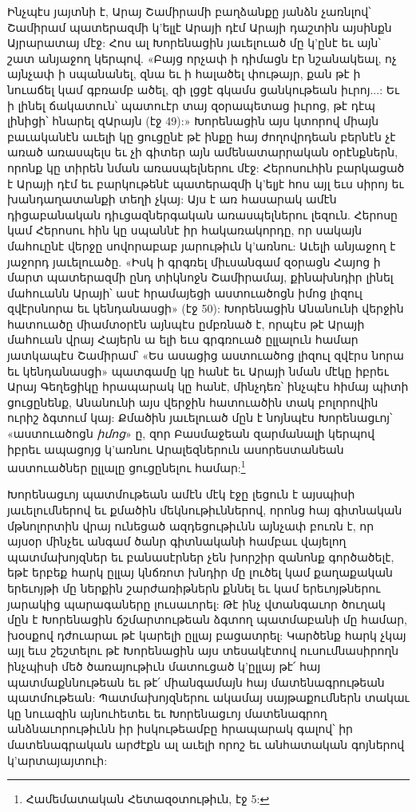 \documentclass{article}
\begin{document}
{Ինչպէս յայտնի է, Արայ Շամիրամի բաղձանքը յանձն չառնլով՝ Շամիրամ պատերազմի կ'ելլէ Արայի դէմ Արայի դաշտին այսինքն Այրարատայ մէջ: Հոս ալ Խորենացին յաւելուած մը կ'ընէ եւ այն՝ շատ անյաջող կերպով. «Բայց որչափ ի դիմացն էր նշանակեալ, ոչ այնչափ ի սպանանել, զնա եւ ի հալածել փութայր, քան թէ ի նուաճել կամ գբռամբ ածել, զի լցցէ գկամս ցանկութեան իւրոյ...: Եւ ի լինել ճակատուն՝ պատուէր տայ զօրապետաց իւրոց, թէ դէպ լինիցի՝ հնարել զԱրայն (էջ 49):» Խորենացին այս կտորով միայն բաւականէն աւելի կը ցուցընէ թէ ինքը հայ ժողովրդեան բերնէն չէ առած առասպելս եւ չի գիտեր այն ամենատարրական օրէնքներն, որոնք կը տիրեն նման առասպելներու մէջ: Հերոսուհին բարկացած է Արայի դէմ եւ բարկութենէ պատերազմի կ'ելյէ հոս այլ եւս սիրոյ եւ խանդաղատանքի տեղի չկայ: Այս է առ հասարակ ամէն դիցաբանական դիւցազներգական առասպելներու լեզուն. Հերոսը կամ Հերոսու հին կը սպաննէ իր հակառակորդը, որ սակայն մահուընէ վերջը սովորաբաբ յարութիւն կ'առնու: Աւելի անյաջող է յաջորդ յաւելուածը. «Իսկ ի գրգռել միւսանգամ զօրացն Հայոց ի մարտ պատերազմի ընդ տիկնոջն Շամիրամայ, քինախնդիր լինել մահուանն Արայի՝ ասէ հրամայեցի աստուածոցն իմոց լիզուլ զվէրսնորա եւ կենդանասցի» (էջ 50): Խորենացին Անանունի վերջին հատուածը միամտօրէն այնպէս ըմբռնած է, որպէս թէ Արայի մահուան վրայ Հայերն ա ելի եւս գրգռուած ըլլալուն համար յատկապէս Շամիրամ՝ «Ես ասացից աստուածոց լիզուլ զվէրս նորա եւ կենդանասցի» պատգամը կը հանէ եւ Արայի նման մէկը իբրեւ Արայ Գեղեցիկը հրապարակ կը հանէ, մինչդեռ՝ ինչպէս հիմայ պիտի ցուցընենք, Անանունի այս վերջին հատուածին տակ բոլորովին ուրիշ ձգտում կայ: Քմածին յաւելուած մըն է նոյնպէս Խորենացւոյ՝ «աստուածոցն \emph{իմոց}» ը, զոր Բասմաջեան զարմանալի կերպով իբրեւ ապացոյց կ'առնու Արալեզներուն ասորեստանեան աստուածներ ըլլալը ցուցընելու համար:\footnote{Համեմատական Հետազօտութիւն, էջ 5:}

Խորենացւոյ պատմութեան ամէն մէկ էջը լեցուն է այսպիսի յաւելումներով եւ քմածին մեկնութիւններով, որոնց հայ գիտնական մթնոլորտին վրայ ունեցած ազդեցութիւնն այնչափ բուռն է, որ այսօր մինչեւ անգամ ծանր գիտնականի համբաւ վայելող պատմախոյզներ եւ բանասէրներ չեն խորշիր զանոնք գործածելէ, եթէ երբեք հարկ ըլլայ կնճռոտ խնդիր մը լուծել կամ քաղաքական երեւոյթի մը ներքին շարժառիթներն քննել եւ կամ երեւոյթներու յարակից պարագաները լուսաւորել: Թէ ինչ վտանգաւոր ծուղակ մըն է Խորենացին ճշմարտութեան ձգտող պատմաբանի մը համար, խօսքով դժուարաւ թէ կարելի ըլլայ բացատրել: Կարծենք հարկ չկայ այլ եւս շեշտելու թէ Խորենացին այս տեսակէտով ուսումնասիրողն ինչպիսի մեծ ծառայութիւն մատուցած կ'ըլլայ թէ՛ հայ պատմաքննութեան եւ թէ՛ միանգամայն հայ մատենագրութեան պատմութեան: Պատմախոյզներու ակամայ սայթաքումներն տակաւ կը նուազին այնուհետեւ եւ Խորենացւոյ մատենագրող անձնաւորութիւնն իր իսկութեամբը հրապարակ գալով՝ իր մատենագրական արժէքն ալ աւելի որոշ եւ անհատական գոյներով կ'արտայայտուի:

}
\end{document}
